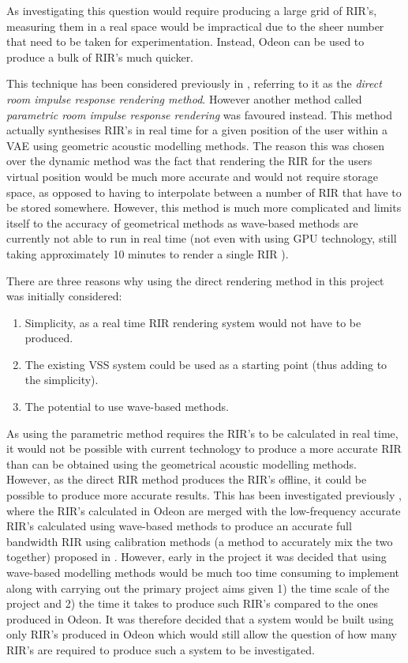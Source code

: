 \documentclass[../../main.tex]{subfiles}
\begin{document}
		 As investigating this question would require producing a large grid of \ac{RIR}'s, measuring them in a real space would be impractical due to the sheer number that need to be taken for experimentation. Instead, Odeon can be used to produce a bulk of \ac{RIR}'s much quicker.

		This technique has been considered previously in \cite{Savioja1999}, referring to it as the \textit{direct room impulse response rendering method}. However another method called \textit{parametric room impulse response rendering} was favoured instead. This method actually synthesises \ac{RIR}'s in real time for a given position of the user within a \ac{VAE} using geometric acoustic modelling methods. The reason this was chosen over the dynamic method was the fact that rendering the \ac{RIR} for the users virtual position would be much more accurate and would not require storage space, as opposed to having to interpolate between a number of \ac{RIR} that have to be stored somewhere. However, this method is much more complicated and limits itself to the accuracy of geometrical methods as wave-based methods are currently not able to run in real time (not even with using GPU technology, still taking approximately 10 minutes to render a single \ac{RIR} \cite{Mehra2010}).

		There are three reasons why using the direct rendering method in this project was initially considered: 
		\begin{enumerate}
			\item Simplicity, as a real time \ac{RIR} rendering system would not have to be produced.
			\item The existing \ac{VSS} system could be used as a starting point (thus adding to the simplicity).
			\item The potential to use wave-based methods.
		\end{enumerate}

		As using the parametric method requires the \ac{RIR}'s to be calculated in real time, it would not be possible with current technology to produce a more accurate \ac{RIR} than can be obtained using the geometrical acoustic modelling methods. However, as the direct \ac{RIR} method produces the \ac{RIR}'s offline, it could be possible to produce more accurate results. This has been investigated previously \cite{Oxnard2013}, where the \ac{RIR}'s calculated in Odeon are merged with the low-frequency accurate \ac{RIR}'s calculated using wave-based methods to produce an accurate full bandwidth \ac{RIR} using calibration methods (a method to accurately mix the two together) proposed in \cite{Southern}. However, early in the project it was decided that using wave-based modelling methods would be much too time consuming to implement along with carrying out the primary project aims given 1) the time scale of the project and 2) the time it takes to produce such \ac{RIR}'s compared to the ones produced in Odeon. It was therefore decided that a system would be built using only \ac{RIR}'s produced in Odeon which would still allow the question of how many \ac{RIR}'s are required to produce such a system to be investigated.
\end{document}
